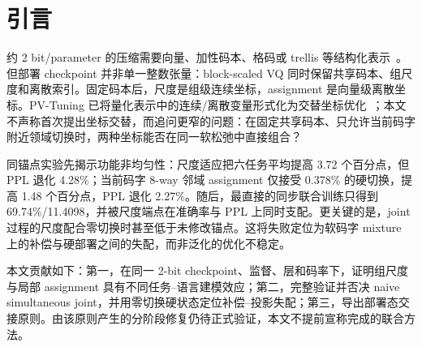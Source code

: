 \section{引言}
约 2 bit/parameter 的压缩需要向量、加性码本、格码或 trellis 等结构化表示~\cite{gptvq,aqlm,quipsharp,qtip}。但部署 checkpoint 并非单一整数张量：block-scaled VQ 同时保留共享码本、组尺度和离散索引。固定码本后，尺度是组级连续坐标，assignment 是向量级离散坐标。PV-Tuning 已将量化表示中的连续/离散变量形式化为交替坐标优化~\cite{pvtuning}；本文不声称首次提出坐标交替，而追问更窄的问题：在固定共享码本、只允许当前码字附近领域切换时，两种坐标能否在同一软松弛中直接组合？

同锚点实验先揭示功能非均匀性：尺度适应把六任务平均提高 3.72 个百分点，但 PPL 退化 4.28\%；当前码字 8-way 邻域 assignment 仅接受 0.378\% 的硬切换，提高 1.48 个百分点，PPL 退化 2.27\%。随后，最直接的同步联合训练只得到 69.74\%/11.4098，并被尺度端点在准确率与 PPL 上同时支配。更关键的是，joint 过程的尺度配合零切换时甚至低于未修改锚点。这将失败定位为软码字 mixture 上的补偿与硬部署之间的失配，而非泛化的优化不稳定。

本文贡献如下：第一，在同一 2-bit checkpoint、监督、层和码率下，证明组尺度与局部 assignment 具有不同任务--语言建模效应；第二，完整验证并否决 naive simultaneous joint，并用零切换硬状态定位补偿--投影失配；第三，导出部署态交接原则。由该原则产生的分阶段修复仍待正式验证，本文不提前宣称完成的联合方法。

